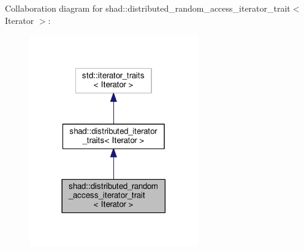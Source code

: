 Collaboration diagram for shad\-:\-:distributed\-\_\-random\-\_\-access\-\_\-iterator\-\_\-trait$<$ Iterator $>$\-:
\nopagebreak
\begin{figure}[H]
\begin{center}
\leavevmode
\includegraphics[width=206pt]{structshad_1_1distributed__random__access__iterator__trait__coll__graph}
\end{center}
\end{figure}
